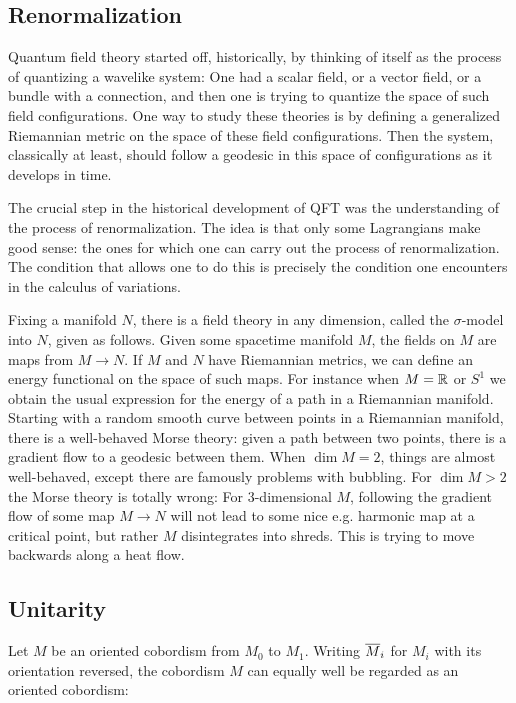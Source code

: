 \subsection{Renormalization}

Quantum field theory started off, historically, by thinking of itself as the process of
quantizing a wavelike system:
One had a scalar field, or a vector field, or a bundle with a connection, and then one
is trying to quantize the space of such field configurations. 
One way to study these theories is by defining a generalized Riemannian metric on the
space of these field configurations.
Then the system, classically at least, should follow a geodesic in this space of
configurations as it develops in time. 

The crucial step in the historical development of QFT was the understanding of
the process of renormalization. 
The idea is that only some Lagrangians make good sense: the ones for which one can carry
out the process of renormalization.
The condition that allows one to do this is precisely the condition one encounters in the
calculus of variations.

Fixing a manifold $N$, there is a field theory in any dimension, called the $\sigma$-model
into $N$, given as follows.
Given some spacetime manifold $M$, the fields on $M$ are maps from $M\to N$.
If $M$ and $N$ have Riemannian metrics, we can define an energy functional on the space of
such maps. For instance when $M = \mathbb{R}$ or $S^1$ we obtain the usual expression for the
energy of a path in a Riemannian manifold. 
Starting with a random smooth curve between points in a Riemannian manifold, there is a
well-behaved Morse theory: given a path between two points, there is a gradient flow to
a geodesic between them. 
When $\dim M = 2$, things are almost well-behaved, except there are famously problems with
bubbling. For $\dim M > 2$ the Morse theory is totally wrong:
For $3$-dimensional $M$, following the gradient flow of some map $M\to N$ will
not lead to some nice e.g. harmonic map at a critical point, but rather $M$ disintegrates
into shreds. This is trying to move backwards along a heat flow.

\subsection{Unitarity}


Let $M$ be an oriented cobordism from $M_0$ to $M_1$.
Writing $\overline{M}_i$ for $M_i$ with its orientation reversed, the cobordism $M$ can equally
well be regarded as an oriented cobordism:

